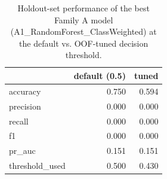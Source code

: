\begin{table}[htbp]
\caption{Holdout-set performance of the best Family A model (A1_RandomForest_ClassWeighted) at the default vs. OOF-tuned decision threshold.}
\label{tab:A1_RandomForest_ClassWeighted_holdout}
\begin{tabular}{lrr}
\toprule
 & default (0.5) & tuned \\
\midrule
accuracy & 0.750 & 0.594 \\
precision & 0.000 & 0.000 \\
recall & 0.000 & 0.000 \\
f1 & 0.000 & 0.000 \\
pr\_auc & 0.151 & 0.151 \\
threshold\_used & 0.500 & 0.430 \\
\bottomrule
\end{tabular}
\end{table}
